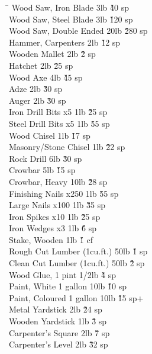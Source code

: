 \begin{multicols}{3}
{\begin{tabbing}
\hspace{0.8\linewidth}\= \kill
Wood Saw, Iron Blade			\> 3lb			\' \` 40 sp \\
Wood Saw, Steel Blade			\> 3lb			\' \` 120 sp \\
Wood Saw, Double Ended			\> 20lb			\' \` 280 sp \\
Hammer, Carpenters			\> 2lb			\' \` 12 sp \\
Wooden Mallet				\> 2lb			\' \` 2 sp \\
Hatchet					\> 2lb			\' \` 25 sp \\
Wood Axe				\> 4lb			\' \` 45 sp \\
Adze					\> 2lb			\' \` 30 sp \\
Auger					\> 2lb			\' \` 30 sp \\
Iron Drill Bits x5			\> 1lb			\' \` 25 sp \\
Steel Drill Bits x5			\> 1lb			\' \` 55 sp \\
Wood Chisel				\> 1lb			\' \` 17 sp \\
Masonry/Stone Chisel			\> 1lb			\' \` 22 sp \\
Rock Drill				\> 6lb			\' \` 30 sp \\
Crowbar					\> 5lb			\' \` 15 sp \\
Crowbar, Heavy				\> 10lb			\' \` 28 sp \\
Finishing Nails x250			\> 1lb			\' \` 55 sp \\
Large Nails x100			\> 1lb			\' \` 35 sp \\
Iron Spikes x10				\> 1lb			\' \` 25 sp \\
Iron Wedges x3				\> 1lb			\' \` 6 sp \\
Stake, Wooden				\> 1lb			\' \` 1 cf \\
Rough Cut Lumber (1cu.ft.)		\> 50lb			\' \` 1 sp \\
Clean Cut Lumber (1cu.ft.)		\> 50lb			\' \` 2 sp \\
Wood Glue, 1 pint			 1/2lb			\' \` 4 sp \\
Paint, White 1 gallon			\> 10lb			\' \` 10 sp \\
Paint, Coloured 1 gallon		\> 10lb			\' \` 15 sp+ \\
Metal Yardstick				\> 2lb			\' \` 24 sp \\
Wooden Yardstick			\> 1lb			\' \` 3 sp \\
Carpenter's Square			\> 2lb			\' \` 7 sp \\
Carpenter's Level			\> 2lb			\' \` 32 sp \\

\end{tabbing}}
\end{multicols}
